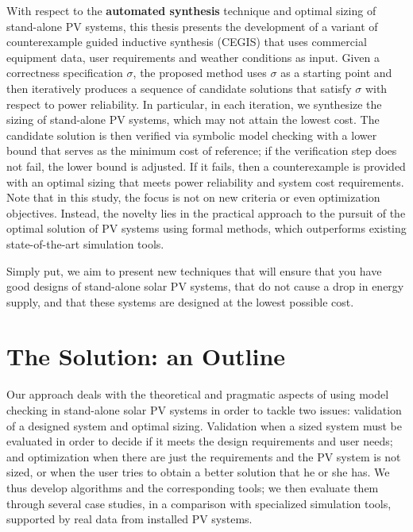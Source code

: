 With respect to the \textbf{automated synthesis} technique and optimal sizing of stand-alone PV systems, this thesis presents the development of a variant of counterexample guided inductive synthesis (CEGIS) that uses commercial equipment data, user requirements and weather conditions as input. Given a correctness specification $\sigma$, the proposed method uses $\sigma$ as a starting point and then iteratively produces a sequence of candidate solutions that satisfy $\sigma$ with respect to power reliability. In particular, in each iteration, we synthesize the sizing of stand-alone PV systems, which may not attain the lowest cost. The candidate solution is then verified via symbolic model checking with a lower bound that serves as the minimum cost of reference; if the verification step does not fail, the lower bound is adjusted. If it fails, then a counterexample is provided with an optimal sizing that meets power reliability and system cost requirements. Note that in this study, the focus is not on new criteria or even optimization objectives. Instead, the novelty lies in the practical approach to the pursuit of the optimal solution of PV systems using formal methods, which outperforms existing state-of-the-art simulation tools.

Simply put, we aim to present new techniques that will ensure that you have good designs of stand-alone solar PV systems, that do not cause a drop in energy supply, and that these systems are designed at the lowest possible cost.

\section{The Solution: an Outline}

Our approach deals with the theoretical and pragmatic aspects of using model checking in stand-alone solar PV systems in order to tackle two issues: validation of a designed system and optimal sizing. Validation when a sized system must be evaluated in order to decide if it meets the design requirements and user needs; and optimization when there are just the requirements and the PV system is not sized, or when the user tries to obtain a better solution that he or she has. We thus develop algorithms and the corresponding tools; we then evaluate them through several case studies, in a comparison with specialized simulation tools, supported by real data from installed PV systems.


